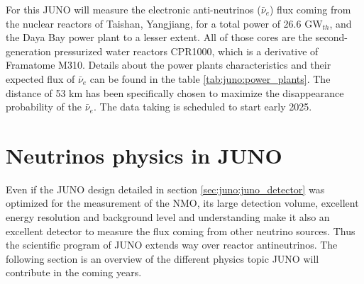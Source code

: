 \documentclass[../main.tex]{subfiles}
\begin{document}
For this JUNO will measure the electronic anti-neutrinos ($\bar{\nu}_e$) flux coming from the nuclear reactors of Taishan, Yangjiang, for a total power of 26.6 GW$_{th}$, and the Daya Bay power plant to a lesser extent. All of those cores are the second-generation pressurized water reactors CPR1000, which is a derivative of Framatome M310. Details about the power plants characteristics and their expected flux of $\bar{\nu}_e$ can be found in the table \ref{tab:juno:power_plants}.
The distance of 53 km has been specifically chosen to maximize the disappearance probability of the $\bar{\nu}_e$. The data taking is scheduled to start early 2025.

\section{Neutrinos physics in JUNO}

Even if the JUNO design detailed in section \ref{sec:juno:juno_detector} was optimized for the measurement of the NMO, its large detection volume, excellent energy resolution and background level and understanding make it also an excellent detector to measure the flux coming from other neutrino sources. Thus the scientific program of JUNO extends way over reactor antineutrinos. The following section is an overview of the different physics topic JUNO will contribute in the coming years.
\end{document}
